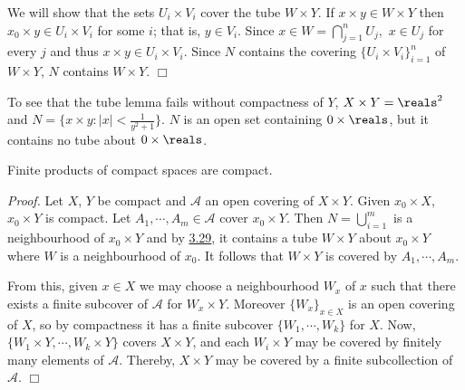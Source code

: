 We will show that the sets $U_i \times V_i$ cover the tube $W \times Y$. If $x \times y \in W \times Y$ then $x_0 \times y \in U_i \times V_i$ for some $i$; that is, $y \in V_i$. Since $x \in W = \bigcap_{j=1}^n U_j,$ $x \in U_j$ for every $j$ and thus $x \times y \in U_i \times V_i.$ Since $N$ contains the covering $\{U_i \times V_i\}_{i=1}^n$ of $W \times Y$, $N$ contains $W \times Y$. $\Box$

To see that the tube lemma fails without compactness of $Y$, $X \times Y = \reals^2$ and $N = \{x \times y: |x|<\frac{1}{y^2+1}\}.$ $N$ is an open set containing $0 \times \reals$, but it contains no tube about $0 \times \reals$.

\begin{theorem}\label{3.30}
    Finite products of compact spaces are compact.
\end{theorem}
{\it Proof.} Let $X$, $Y$ be compact and $\mathcal{A}$ an open covering of $X \times Y$. Given $x_0 \times X$, $x_0 \times Y$ is compact. Let $A_1, \cdots, A_m \in \mathcal{A}$ cover $x_0 \times Y$. Then $N = \bigcup_{i=1}^m$ is a neighbourhood of $x_0 \times Y$ and by \hyperref[3.29]{3.29}, it contains a tube $W \times Y$ about $x_0 \times Y$ where $W$ is a neighbourhood of $x_0$. It follows that $W \times Y$ is covered by $A_1, \cdots, A_m$.

From this, given $x \in X$ we may choose a neighbourhood $W_x$ of $x$ such that there exists a finite subcover of $\mathcal{A}$ for $W_x \times Y$. Moreover $\{W_x\}_{x \in X}$ is an open covering of $X$, so by compactness it has a finite subcover $\{W_1, \cdots, W_k\}$ for $X$. Now, $\{W_1 \times Y, \cdots, W_k \times Y\}$ covers $X \times Y$, and each $W_i \times Y$ may be covered by finitely many elements of $\mathcal{A}$. Thereby, $X \times Y$ may be covered by a finite subcollection of $\mathcal{A}$. $\Box$

